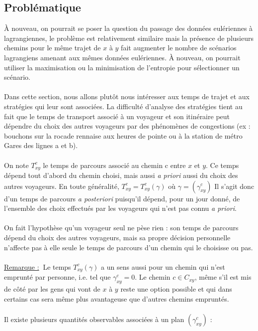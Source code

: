 \documentclass[12pt]{article}
\newcommand{\rmq}{\underline{Remarque :}}
\begin{document}
\subsection{Problématique}
À nouveau, on pourrait se poser la question du passage des données eulériennes à lagrangiennes, le problème est relativement similaire mais la présence de plusieurs chemins pour le même trajet de $x$ à $y$ fait augmenter le nombre de scénarios lagrangiens amenant aux mêmes données eulériennes. À nouveau, on pourrait utiliser la maximisation ou la minimisation de l'entropie pour sélectionner un scénario.\\
\\
Dans cette section, nous allons plutôt nous intéresser aux temps de trajet et aux stratégies qui leur sont associées.
La difficulté d'analyse des stratégies tient au fait que le temps de transport associé à un voyageur et son itinéraire peut dépendre du choix des autres voyageurs par des phénomènes de congestions (ex : bouchons sur la rocade rennaise aux heures de pointe ou à la station de métro Gares des lignes a et b).\\
\\
On note $T^c_{xy}$ le temps de parcours associé au chemin c entre $x$ et $y$. Ce temps dépend tout d'abord du chemin choisi, mais aussi \textit{a priori} aussi du choix des autres voyageurs. En toute généralité, $T^c_{xy} = T^c_{xy}(\gamma)$ où $\gamma = (\gamma^c_{xy})$ Il s'agit donc d'un temps de parcours \textit{a posteriori} puisqu'il dépend, pour un jour donné, de l'ensemble des choix effectués par les voyageurs qui n'est pas connu \textit{a priori}.\\
\\
On fait l'hypothèse qu'un voyageur seul ne pèse rien : son temps de parcours dépend du choix des autres voyageurs, mais sa propre décision personnelle n'affecte pas à elle seule le temps de parcours d'un chemin qui le choisisse ou pas.\\
\\
\rmq $\:$ Le temps $T^c_{xy}(\gamma)$ a un sens aussi pour un chemin qui n'est emprunté par personne, i.e. tel que $\gamma^c_{xy} = 0$. Le chemin $c \in C_{xy}$, même s'il est mis de côté par les gens qui vont de $x$ à $y$ reste une option possible et qui dans certains cas sera même plus avantageuse que d'autres chemins empruntés.\\
\\
Il existe plusieurs quantités observables associées à un plan $(\gamma^c_{xy})$ :\\
\\
\end{document}
